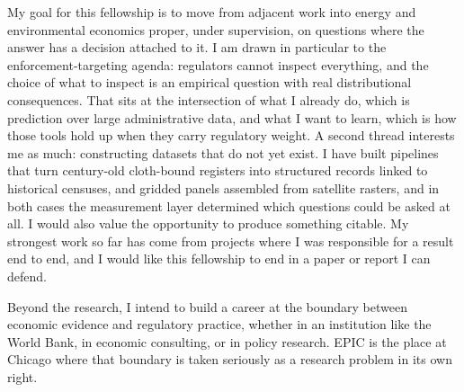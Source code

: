 My goal for this fellowship is to move from adjacent work into energy and environmental economics proper, under supervision, on questions where the answer has a decision attached to it. I am drawn in particular to the enforcement-targeting agenda: regulators cannot inspect everything, and the choice of what to inspect is an empirical question with real distributional consequences. That sits at the intersection of what I already do, which is prediction over large administrative data, and what I want to learn, which is how those tools hold up when they carry regulatory weight. A second thread interests me as much: constructing datasets that do not yet exist. I have built pipelines that turn century-old cloth-bound registers into structured records linked to historical censuses, and gridded panels assembled from satellite rasters, and in both cases the measurement layer determined which questions could be asked at all. I would also value the opportunity to produce something citable. My strongest work so far has come from projects where I was responsible for a result end to end, and I would like this fellowship to end in a paper or report I can defend.

Beyond the research, I intend to build a career at the boundary between economic evidence and regulatory practice, whether in an institution like the World Bank, in economic consulting, or in policy research. EPIC is the place at Chicago where that boundary is taken seriously as a research problem in its own right.



